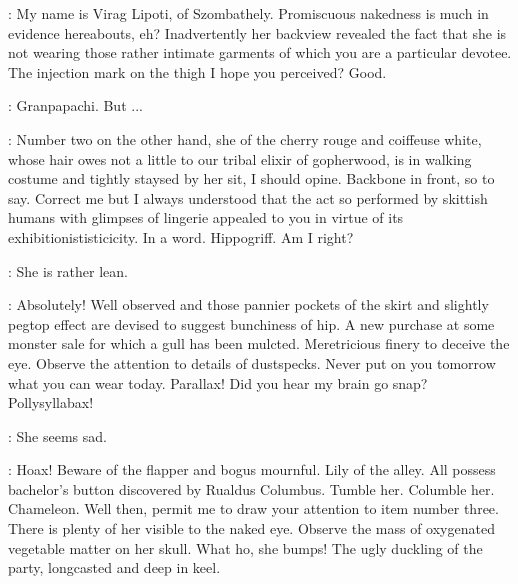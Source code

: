 
\Virag:
My name is Virag Lipoti, of Szombathely.
Promiscuous nakedness is much in evidence hereabouts, eh?
Inadvertently her backview revealed the fact that she is not wearing
those rather intimate garments of which you are a particular devotee.
The injection mark on the thigh I hope you perceived?
Good.

\Bloom:
Granpapachi. But ...

\Virag:
Number two on the other hand, she of the cherry rouge and coiffeuse white,%
whose hair owes not a little to our tribal elixir of gopherwood,
is in walking costume and tightly staysed by her sit, I should opine.
Backbone in front, so to say.
Correct me but I always understood that the act so performed by skittish humans
with glimpses of lingerie appealed to you in virtue of its exhibitionististicicity.
In a word. Hippogriff.
Am I right?

\Bloom:
She is rather lean.

\Virag:
Absolutely!
Well observed and those pannier pockets of the skirt
and slightly pegtop effect are devised to suggest bunchiness of hip.
A new purchase at some monster sale for which a gull has been mulcted.
Meretricious finery to deceive the eye.
Observe the attention to details of dustspecks.
Never put on you tomorrow what you can wear today.
Parallax!
Did you hear my brain go snap?
Pollysyllabax!

\Bloom:
She seems sad.

\Virag:
Hoax! Beware of the flapper and bogus mournful.
Lily of the alley.
All possess bachelor's button discovered by Rualdus Columbus.
Tumble her. Columble her. Chameleon.
Well then, permit me to draw your attention to item number three.
There is plenty of her visible to the naked eye.
Observe the mass of oxygenated vegetable matter on her skull.
What ho, she bumps!
The ugly duckling of the party, longcasted and deep in keel.

